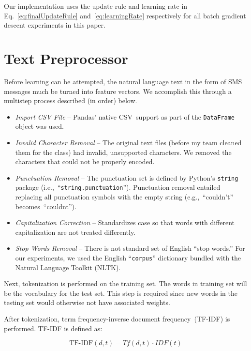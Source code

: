 \documentclass{report}
\begin{document}
  \noindent
  Our implementation uses the update rule and learning rate in Eq.~\eqref{eq:finalUpdateRule} and~\eqref{eq:learningRate} respectively for all batch gradient descent experiments in this paper.
    
  \section{Text Preprocessor}
  
  Before learning can be attempted, the natural language text in the form of SMS messages much be turned into feature vectors.  We accomplish this through a multistep process described (in order) below.

  \begin{itemize}
    \item \textit{Import CSV File} -- Pandas' native CSV~support as part of the \texttt{DataFrame} object was used.
    \item \textit{Invalid Character Removal} -- The original text files (before my team cleaned them for the class) had invalid, unsupported characters.  We removed the characters that could not be properly encoded.
    \item \textit{Punctuation Removal} -- The punctuation set is defined by Python's \texttt{string} package (i.e.,~``\texttt{string.punctuation}'').  Punctuation removal entailed replacing all punctuation symbols with the empty string (e.g.,~``couldn't'' becomes~``couldnt'').
    \item \textit{Capitalization Correction} -- Standardizes case so that words with different capitalization are not treated differently.
    \item \textit{Stop Words Removal} -- There is not standard set of English ``stop words.''  For our experiments, we used the English ``\texttt{corpus}'' dictionary bundled with the Natural Language Toolkit (NLTK).
  \end{itemize}

  Next, tokenization is performed on the training set.  The words in training set will be the vocabulary for the test set.  This step is required since new words in the testing set would otherwise not have associated weights.
  
  After tokenization, term frequency-inverse document frequency~(TF-IDF) is performed.  TF-IDF is defined as:
  
  \begin{equation}
    \text{TF-IDF}(d,t) = Tf(d,t) \cdot IDF(t)
  \end{equation}
  
\end{document}
